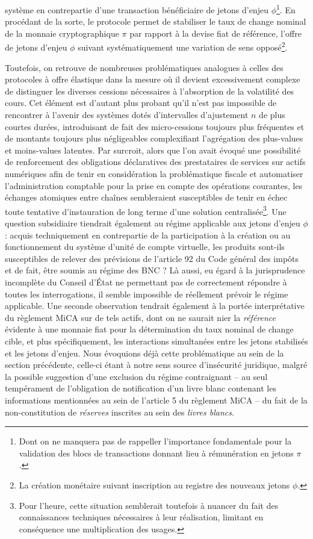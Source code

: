 {système en contrepartie d'une transaction bénéficiaire de jetons d'enjeu $\phi$\footnote{Dont on ne manquera pas de rappeller l'importance fondamentale pour la validation des blocs de transactions donnant lieu à rémunération en jetons $\pi$.}. En procédant de la sorte, le protocole permet de stabiliser le taux de change nominal de la monnaie cryptographique $\pi$ par rapport à la devise fiat de référence, l'offre de jetons d'enjeu $\phi$ suivant systématiquement une variation de sens opposé\footnote{La création monétaire suivant inscription au registre des nouveaux jetons $\phi$.}.\par

Toutefois, on retrouve de nombreuses problématiques analogues à celles des protocoles à offre élastique dans la mesure où il devient excessivement complexe de distinguer les diverses cessions nécessaires à l'absorption de la volatilité des cours. Cet élément est d'autant plus probant qu'il n'est pas impossible de rencontrer à l'avenir des systèmes dotés d'intervalles d'ajustement $n$ de plus courtes durées, introduisant de fait des micro-cessions toujours plus fréquentes et de montants toujours plus négligeables complexifiant l'agrégation des plus-values et moins-values latentes. Par surcroit, alors que l'on avait évoqué une possibilité de renforcement des obligations déclaratives des prestataires de services sur actifs numériques afin de tenir en considération la problématique fiscale et automatiser l'administration comptable pour la prise en compte des opérations courantes, les échanges atomiques entre chaînes sembleraient susceptibles de tenir en échec toute tentative d'instauration de long terme d'une solution centralisée\footnote{Pour l'heure, cette situation semblerait toutefois à nuancer du fait des connaissances techniques nécessaires à leur réalisation, limitant en conséquence une multiplication des usages.}. Une question subsidiaire tiendrait également au régime applicable aux jetons d'enjeu $\phi$ : acquis techniquement en contrepartie de la participation à la création ou au fonctionnement du système d'unité de compte virtuelle, les produits sont-ils susceptibles de relever des prévisions de l'article 92 du Code général des impôts et de fait, être soumis au régime des BNC ? Là aussi, eu égard à la jurisprudence incomplète du Conseil d'État ne permettant pas de correctement répondre à toutes les interrogations, il semble impossible de réellement prévoir le régime applicable. Une seconde observation tendrait également à la portée interprétative du règlement MiCA sur de tels actifs, dont on ne saurait nier la \emph{référence} évidente à une monnaie fiat pour la détermination du taux nominal de change cible, et plus spécifiquement, les interactions simultanées entre les jetons stabilisés et les jetons d'enjeu. Nous évoquions déjà cette problématique au sein de la section précédente, celle-ci étant à notre sens source d'insécurité juridique, malgré la possible suggestion d'une exclusion du régime contraignant \---{} au seul tempérament de l'obligation de notification d'un livre blanc contenant les informations mentionnées au sein de l'article 5 du règlement MiCA \---{} du fait de la non-constitution de \emph{réserves} inscrites au sein des \emph{livres blancs}.\par

}
